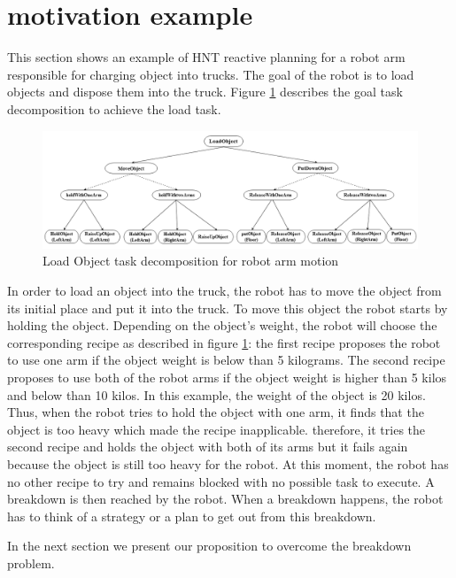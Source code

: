 \documentclass[conference]{IEEEtran}
\begin{document}
	
	
	\section{motivation example}
	\label{sec:example}
	

	
	\par This section shows an example of HNT reactive planning for a robot arm responsible for charging object into trucks. 
	The goal of the robot is to load objects and dispose them into the truck. Figure \ref{fig:ex} describes the goal task decomposition to achieve the load task.
	 	\begin{figure}[t]
	 		\label{fig:ex}
	 		\includegraphics[width=\textwidth]{Figures/example1}
	 		\caption{Load Object task decomposition for robot arm motion}
	 	\end{figure}
	In order to load an object into the truck, the robot has to move the object from its initial place and put it into the truck. 
	To move this object the robot starts by holding the object. Depending on the object's  weight, the robot will choose the corresponding recipe as described in figure \ref{fig:ex}: the first recipe proposes the robot to use one arm if the object weight is below than 5 kilograms. The second recipe proposes to use both of the robot arms if the object weight is higher than 5 kilos and below than 10 kilos.
	In this example, the weight of the object is 20 kilos. Thus, when the robot tries to hold the object with one arm, it finds that the object is too heavy which made the recipe inapplicable. therefore, it tries the second recipe and holds the object with both of its arms but it fails again because the object is still too heavy for the robot. At this moment, the robot has no other recipe to try and remains blocked with no possible task to execute. A breakdown is then reached by the robot. When a breakdown happens, the robot has to think of a strategy or a plan to get out from this breakdown. 
	
	\par In the next section we present our proposition to overcome the breakdown problem. 
	
\end{document}
